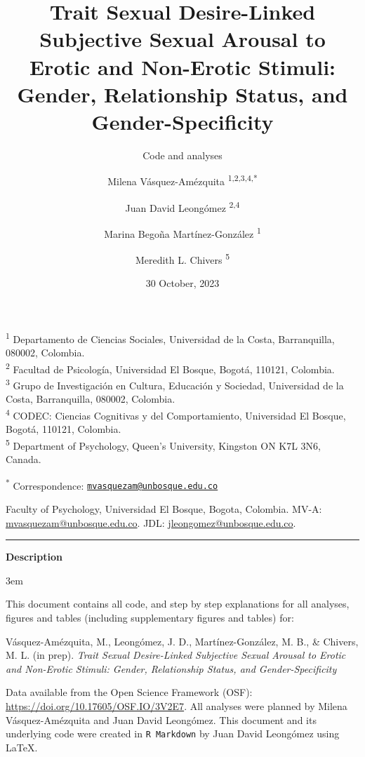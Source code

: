 \documentclass[
  bookmarksnumbered]{article}
\title{Trait Sexual Desire-Linked Subjective Sexual Arousal to Erotic and Non-Erotic Stimuli: Gender, Relationship Status, and Gender-Specificity}
\subtitle{Code and analyses}
\author{Milena Vásquez-Amézquita \orcidlink{0000-0001-7317-8430}\textsuperscript{1,2,3,4,*} \and Juan David Leongómez \orcidlink{0000-0002-0092-6298}\textsuperscript{2,4} \and Marina Begoña Martínez-González \orcidlink{0000-0002-5840-6383}\textsuperscript{1} \and Meredith L. Chivers \orcidlink{0000-0002-5495-9263}\textsuperscript{5}}
\date{30 October, 2023}
\begin{document}
\maketitle

\textsuperscript{1} Departamento de Ciencias Sociales, Universidad de la Costa, Barranquilla, 080002, Colombia.\\
\textsuperscript{2} Facultad de Psicología, Universidad El Bosque, Bogotá, 110121, Colombia.\\
\textsuperscript{3} Grupo de Investigación en Cultura, Educación y Sociedad, Universidad de la Costa, Barranquilla, 080002, Colombia.\\
\textsuperscript{4} CODEC: Ciencias Cognitivas y del Comportamiento, Universidad El Bosque, Bogotá, 110121, Colombia.\\
\textsuperscript{5} Department of Psychology, Queen's University, Kingston ON K7L 3N6, Canada.

\textsuperscript{*} Correspondence: \href{mailto:mvasquezam@unbosque.edu.co}{\href{mailto:mvasquezam@unbosque.edu.co}{\nolinkurl{mvasquezam@unbosque.edu.co}}}

\begin{center}
Faculty of Psychology, Universidad El Bosque, Bogota, Colombia. \linebreak
MV-A: \href{mailto:mvasquezam@unbosque.edu.co}{mvasquezam@unbosque.edu.co}. 
JDL: \href{mailto:jleongomez@unbosque.edu.co}{jleongomez@unbosque.edu.co}.

\begin{center}\rule{0.5\linewidth}{0.5pt}\end{center}

\textbf{Description}
\end{center}

\par
\begingroup
\leftskip3em
\rightskip\leftskip

This document contains all code, and step by step explanations for all analyses, figures and tables (including supplementary figures and tables) for:

\begin{hangparas}{.25in}{1}
Vásquez-Amézquita, M., Leongómez, J. D., Martínez-González, M. B., \& Chivers, M. L. (in prep). \textit{Trait Sexual Desire-Linked Subjective Sexual Arousal to Erotic and Non-Erotic Stimuli: Gender, Relationship Status, and Gender-Specificity}
\end{hangparas}

Data available from the Open Science Framework (OSF): \url{https://doi.org/10.17605/OSF.IO/3V2E7}. All analyses were planned by Milena Vásquez-Amézquita and Juan David Leongómez. This document and its underlying code were created in \texttt{R\ Markdown} by Juan David Leongómez using \LaTeX.
\end{document}
